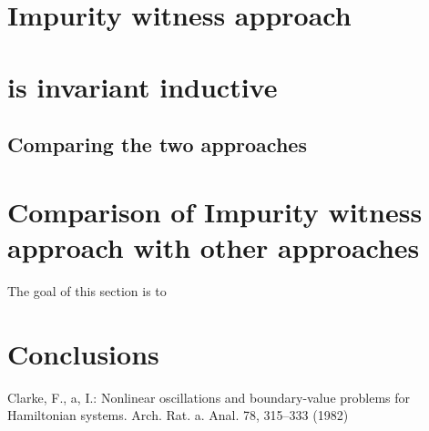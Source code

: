 \documentclass{llncs}
\newcommand{\foo}{\textit{foo}}
\newcommand{\inv}{\mathit{inv}}
\newcommand{\pathCondition}{\mathit{T_{\foo}}}
\newcommand{\mi}[1]{\mathit{#1}}
\newcommand{\g}{\textit{g}}
\begin{document}
\section{Impurity witness approach}
\section{is invariant inductive}


\subsection{Comparing the two approaches}
\section{Comparison of Impurity witness approach with other approaches}
The goal of this section is to 

\section{Conclusions}
%

%
%
\begin{thebibliography}{5}
%
Clarke, F., a, I.:
Nonlinear oscillations and
boundary-value problems for Hamiltonian systems.
Arch. Rat. a. Anal. 78, 315--333 (1982)


\end{thebibliography}
\end{document}
